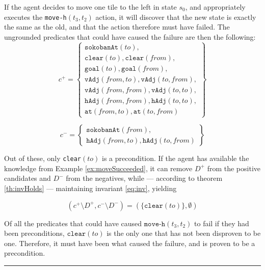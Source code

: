 \documentclass[../Master.tex]{subfiles}
\begin{document}
\begin{example}
    If the agent decides to move one tile to the left in state $s_0$, and appropriately executes the \texttt{move-h}$(t_3, t_2)$ action, it will discover that the new state is exactly the same as the old, and that the action therefore must have failed. The ungrounded predicates that could have caused the failure are then the following:
    \begin{equation*}
        c^+ = \left\{
            \begin{gathered}
                \texttt{sokobanAt}(to), \\
                \texttt{clear}(to), \texttt{clear}(from), \\
                \texttt{goal}(to), \texttt{goal}(from), \\
                \texttt{vAdj}(from, to), \texttt{vAdj}(to, from), \\
                \texttt{vAdj}(from, from), \texttt{vAdj}(to, to), \\
                \texttt{hAdj}(from, from), \texttt{hAdj}(to, to), \\
                \texttt{at}(from, to), \texttt{at}(to, from)
            \end{gathered}
        \right\}
    \end{equation*}

    \begin{equation*}
        c^- = \left\{
            \begin{gathered}
                \texttt{sokobanAt}(from), \\
                \texttt{hAdj}(from, to), \texttt{hAdj}(to, from)
            \end{gathered}
        \right\}
    \end{equation*}

    Out of these, only \texttt{clear}$(to)$ is a precondition. If the agent has available the knowledge from Example \ref{ex:moveSucceeded}, it can remove $D^+$ from the positive candidates and $D^-$ from the negatives, while --- according to theorem \ref{th:invHolds} --- maintaining invariant \eqref{eq:inv}, yielding

    \begin{equation*}
        \left( c^+ \setminus D^+, c^- \setminus D^- \right) =
        \left( \{\texttt{clear}(to) \}, \emptyset \right)
    \end{equation*}

    Of all the predicates that could have caused $\texttt{move-h}(t_3, t_2)$ to fail if they had been preconditions, $\texttt{clear}(to)$ is the only one that has not been disproven to be one. Therefore, it must have been what caused the failure, and is proven to be a precondition.

    \noindent\rule{\textwidth}{1pt}
\end{example}
\end{document}
